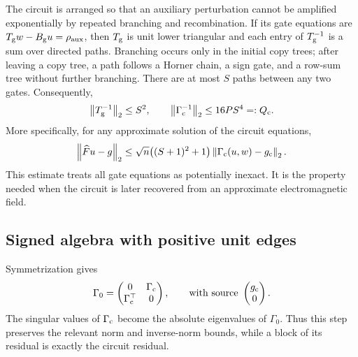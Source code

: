 The circuit is arranged so that an auxiliary perturbation cannot be
amplified exponentially by repeated branching and recombination. If its
gate equations are $T_{\rm g}w-B_{\rm g}u=\rho_{\rm aux}$, then $T_{\rm g}$ is unit lower triangular
and each entry of $T_{\rm g}^{-1}$ is a sum over directed paths. Branching occurs
only in the initial copy trees; after leaving a copy tree, a path follows
a Horner chain, a sign gate, and a row-sum tree without further branching.
There are at most $S$ paths between any two gates. Consequently,
\begin{equation}
 \left\lVert T_{\rm g}^{-1}\right\rVert_2\le S^2,
 \qquad \left\lVert \Gamma_{\rm c}^{-1}\right\rVert_2\le16PS^4=:Q_{\rm c}.
 \label{d:eq:logical-circuit-stability}
\end{equation}
More specifically, for any approximate solution of the circuit equations,
\begin{equation}
 \left\lVert \widehat F u-g\right\rVert_2
 \le \sqrt n\bigl((S+1)^2+1\bigr)
      \left\lVert \Gamma_{\rm c}(u,w)-g_{\rm c}\right\rVert_2.
 \label{d:eq:logical-circuit-residual}
\end{equation}
This estimate treats all gate equations as potentially inexact. It is the
property needed when the circuit is later recovered from an approximate
electromagnetic field.

\subsection{Signed algebra with positive unit edges}

Symmetrization gives
\begin{equation}
 \Gamma_0=\begin{pmatrix}0&\Gamma_{\rm c}\\\Gamma_{\rm c}^\top&0\end{pmatrix},
 \qquad\text{with source }\begin{pmatrix}g_{\rm c}\\0\end{pmatrix}.
 \label{d:eq:logical-symmetrization}
\end{equation}
The singular values of $\Gamma_{\rm c}$ become the absolute eigenvalues of $\Gamma_0$.
Thus this step preserves the relevant norm and inverse-norm bounds,
while a block of its residual is exactly the circuit residual.

